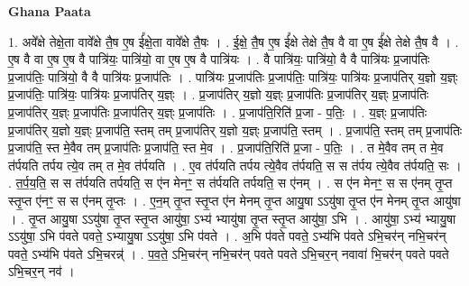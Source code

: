 \documentclass[17pt]{extarticle}
\begin{document}
\textbf{Ghana Paata } \newline

1. अवे᳚क्षे तेक्षे॒ता वावे᳚क्षे तै॒ष ए॒ष ई᳚क्षे॒ता वावे᳚क्षे तै॒षः । . ई॒क्षे॒ तै॒ष ए॒ष ई᳚क्षे तेक्षे तै॒ष वै वा ए॒ष ई᳚क्षे तेक्षे तै॒ष वै । . ए॒ष वै वा ए॒ष ए॒ष वै पात्रि॑यः॒ पात्रि॑यो॒ वा ए॒ष ए॒ष वै पात्रि॑यः । . वै पात्रि॑यः॒ पात्रि॑यो॒ वै वै पात्रि॑यः प्र॒जाप॑तिः प्र॒जाप॑तिः॒ पात्रि॑यो॒ वै वै पात्रि॑यः प्र॒जाप॑तिः । . पात्रि॑यः प्र॒जाप॑तिः प्र॒जाप॑तिः॒ पात्रि॑यः॒ पात्रि॑यः प्र॒जाप॑तिर् य॒ज्ञो य॒ज्ञ्ः प्र॒जाप॑तिः॒ पात्रि॑यः॒ पात्रि॑यः प्र॒जाप॑तिर् य॒ज्ञ्ः । . प्र॒जाप॑तिर् य॒ज्ञो य॒ज्ञ्ः प्र॒जाप॑तिः प्र॒जाप॑तिर् य॒ज्ञ्ः प्र॒जाप॑तिः प्र॒जाप॑तिर् य॒ज्ञ्ः प्र॒जाप॑तिः प्र॒जाप॑तिर् य॒ज्ञ्ः प्र॒जाप॑तिः । . प्र॒जाप॑ति॒रिति॑ प्र॒जा - प॒तिः॒ । . य॒ज्ञ्ः प्र॒जाप॑तिः प्र॒जाप॑तिर् य॒ज्ञो य॒ज्ञ्ः प्र॒जाप॑ति॒ स्तम् तम् प्र॒जाप॑तिर् य॒ज्ञो य॒ज्ञ्ः प्र॒जाप॑ति॒ स्तम् । . प्र॒जाप॑ति॒ स्तम् तम् प्र॒जाप॑तिः प्र॒जाप॑ति॒ स्त मे॒वैव तम् प्र॒जाप॑तिः प्र॒जाप॑ति॒ स्त मे॒व । . प्र॒जाप॑ति॒रिति॑ प्र॒जा - प॒तिः॒ । . त मे॒वैव तम् त मे॒व त॑र्पयति तर्पय त्ये॒व तम् त मे॒व त॑र्पयति । . ए॒व त॑र्पयति तर्पय त्ये॒वैव त॑र्पयति॒ स स त॑र्पय त्ये॒वैव त॑र्पयति॒ सः । . त॒र्प॒य॒ति॒ स स त॑र्पयति तर्पयति॒ स ए॑न मेनꣳ॒॒ स त॑र्पयति तर्पयति॒ स ए॑नम् । . स ए॑न मेनꣳ॒॒ स स ए॑नम् तृ॒प्त स्तृ॒प्त ए॑नꣳ॒॒ स स ए॑नम् तृ॒प्तः । . ए॒न॒म् तृ॒प्त स्तृ॒प्त ए॑न मेनम् तृ॒प्त आयु॒षा ऽऽयु॑षा तृ॒प्त ए॑न मेनम् तृ॒प्त आयु॑षा । . तृ॒प्त आयु॒षा ऽऽयु॑षा तृ॒प्त स्तृ॒प्त आयु॑षा॒ ऽभ्य॑ भ्यायु॑षा तृ॒प्त स्तृ॒प्त आयु॑षा॒ ऽभि । . आयु॑षा॒ ऽभ्य॑ भ्यायु॒षा ऽऽयु॑षा॒ ऽभि प॑वते पवते॒ ऽभ्यायु॒षा ऽऽयु॑षा॒ ऽभि प॑वते । . अ॒भि प॑वते पवते॒ ऽभ्य॑भि प॑वते ऽभि॒चर॑न् नभि॒चर॑न् पवते॒ ऽभ्य॑भि प॑वते ऽभि॒चरन्न्॑ । . प॒व॒ते॒ ऽभि॒चर॑न् नभि॒चर॑न् पवते पवते ऽभि॒चर॒न् नवावा॑ भि॒चर॑न् पवते पवते ऽभि॒चर॒न् नव॑ । \newline
\end{document}
